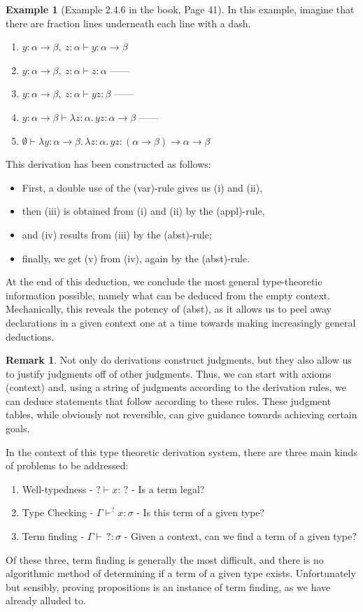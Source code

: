\documentclass{article}
\theoremstyle{definition}
\newtheorem{example}[theorem]{Example}
\newtheorem{remark} [theorem] {Remark}
\newcommand{\1}{\mathbb{1}}
\newcommand{\0}{\mathbb{0}}
\begin{document}
\begin{example}[Example 2.4.6 in the book, Page 41] 
In this example, imagine that there are fraction lines underneath each line with a dash. 
\begin{enumerate}[label=(\roman*)]
  \item $y : \alpha \to \beta,\ z : \alpha \vdash y : \alpha \to \beta$
  \item $y : \alpha \to \beta,\ z : \alpha \vdash z : \alpha$ ——
  \item $y : \alpha \to \beta,\ z : \alpha \vdash yz : \beta$ ——
  \item $y : \alpha \to \beta \vdash \lambda z{:}\alpha.\, yz : \alpha \to \beta$ ——
  \item $\emptyset \vdash \lambda y{:}\alpha \to \beta.\, \lambda z{:}\alpha.\, yz : (\alpha \to \beta) \to \alpha \to \beta$
\end{enumerate}
This derivation has been constructed as follows:
\begin{itemize}
  \item First, a double use of the (var)-rule gives us (i) and (ii),
  \item then (iii) is obtained from (i) and (ii) by the (appl)-rule,
  \item and (iv) results from (iii) by the (abst)-rule;
  \item finally, we get (v) from (iv), again by the (abst)-rule.
\end{itemize}
At the end of this deduction, we conclude the most general type-theoretic information possible, namely what can be deduced from the empty context. Mechanically, this reveals the potency of (abst), as it allows us to peel away declarations in a given context one at a time towards making increasingly general deductions. 
\end{example}

\begin{remark}
    Not only do derivations construct judgments, but they also allow us to justify judgments off of other judgments. Thus, we can start with axioms (context) and, using a string of judgments according to the derivation rules, we can deduce statements that follow according to these rules. These judgment tables, while obviously not reversible, can give guidance towards achieving certain goals. 
\end{remark}

In the context of this type theoretic derivation system, there are three main kinds of problems to be addressed:
\begin{enumerate}
    \item Well-typedness - $? \vdash x : \, ?$ - Is a term legal?
    \item Type Checking - $\Gamma \vdash^{?} x : \sigma$ - Is this term of a given type?
    \item Term finding - $\Gamma \vdash \,? : \sigma$ - Given a context, can we find a term of a given type?
\end{enumerate}
Of these three, term finding is generally the most difficult, and there is no algorithmic method of determining if a term of a given type exists. Unfortunately but sensibly, proving propositions is an instance of term finding, as we have already alluded to.
\end{document}
